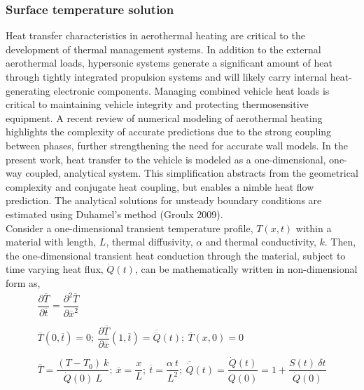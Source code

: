 \documentclass[%
 aip,
 amsmath,amssymb,
preprint,%
]{revtex4-1}
\begin{document}
\subsubsection{Surface temperature solution}
Heat transfer characteristics in aerothermal heating are critical to the development of thermal management systems. In addition to the external aerothermal loads, hypersonic systems generate a significant amount of heat through tightly integrated propulsion systems and will likely carry internal heat-generating electronic components. Managing combined vehicle heat loads is critical to maintaining vehicle integrity and protecting thermosensitive equipment. A recent review of numerical modeling of aerothermal heating \citep{lewis_conjugate_2023} highlights the complexity of accurate predictions due to the strong coupling between phases, further strengthening the need for accurate wall models.   In the present work, heat transfer to the vehicle is modeled as a one-dimensional, one-way coupled, analytical system. This simplification abstracts from the geometrical complexity and conjugate heat coupling, but enables a nimble heat flow prediction. The analytical solutions for unsteady boundary conditions are estimated using Duhamel's method (Groulx 2009). \\
Consider a one-dimensional transient temperature profile, $T(x,t)$ within a material with length, $L$, thermal diffusivity, $\alpha$ and thermal conductivity, $k$. Then, the one-dimensional transient heat conduction through the material, subject to time varying heat flux, $\dot{Q}(t)$, can be mathematically written in non-dimensional form as,
\begin{equation}
    \begin{array}{lr}
        \dfrac {\partial \overline{T}}{\partial \overline{t}} = \dfrac {\partial^{2} \overline{T}}{\partial \overline{x}^{2}} \\
        \\
        \overline{T}(0,\overline{t}) = 0; ~ \dfrac {\partial \overline{T}}{\partial \overline{x}}(1,\overline{t}) = \overline{\dot{Q}}(t); ~ \overline{T}(x,0) = 0  \\ 
        \\
        \overline{T} = \dfrac {(T-T_0)~k}{\dot{Q}(0)~L}; ~ \overline{x} = \dfrac {x}{L}; ~\overline{t} = \dfrac {\alpha~t}{L^{2}}; ~  \overline{\dot{Q}}(t) = \dfrac{\dot{Q}(t)}{\dot{Q}(0)} = 1 + \dfrac{S(t)~\delta t}{\dot{Q}(0)}
    \end{array}
    \label{duhamel}
\end{equation}
\end{document}
